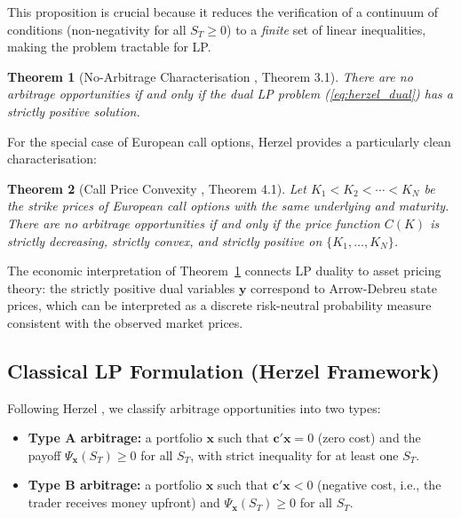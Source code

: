 \documentclass[openany]{book}
\numberwithin{figure}{chapter}
\numberwithin{equation}{chapter}
\newtheorem{theorem}{Theorem}[chapter]
\begin{document}
This proposition is crucial because it reduces the verification of a continuum of conditions (non-negativity for all $S_T \geq 0$) to a \textit{finite} set of linear inequalities, making the problem tractable for LP.

\begin{theorem}[No-Arbitrage Characterisation {\cite{herzel2005}, Theorem 3.1}]
\label{thm:herzel_main}
There are no arbitrage opportunities if and only if the dual LP problem (\ref{eq:herzel_dual}) has a strictly positive solution.
\end{theorem}

For the special case of European call options, Herzel provides a particularly clean characterisation:

\begin{theorem}[Call Price Convexity {\cite{herzel2005}, Theorem 4.1}]
\label{thm:call_convexity}
Let $K_1 < K_2 < \cdots < K_N$ be the strike prices of European call options with the same underlying and maturity. There are no arbitrage opportunities if and only if the price function $C(K)$ is strictly decreasing, strictly convex, and strictly positive on $\{K_1, \ldots, K_N\}$.
\end{theorem}

The economic interpretation of Theorem~\ref{thm:herzel_main} connects LP duality to asset pricing theory: the strictly positive dual variables $\mathbf{y}$ correspond to Arrow-Debreu state prices, which can be interpreted as a discrete risk-neutral probability measure consistent with the observed market prices.

\subsection{Classical LP Formulation (Herzel Framework)}
%
%

Following Herzel \cite{herzel2005}, we classify arbitrage opportunities into two types:
\begin{itemize}
    \item \textbf{Type A arbitrage:} a portfolio $\mathbf{x}$ such that $\mathbf{c}'\mathbf{x} = 0$ (zero cost) and the payoff $\Psi_{\mathbf{x}}(S_T) \geq 0$ for all $S_T$, with strict inequality for at least one $S_T$.
    \item \textbf{Type B arbitrage:} a portfolio $\mathbf{x}$ such that $\mathbf{c}'\mathbf{x} < 0$ (negative cost, i.e., the trader receives money upfront) and $\Psi_{\mathbf{x}}(S_T) \geq 0$ for all $S_T$.
\end{itemize}
\end{document}
